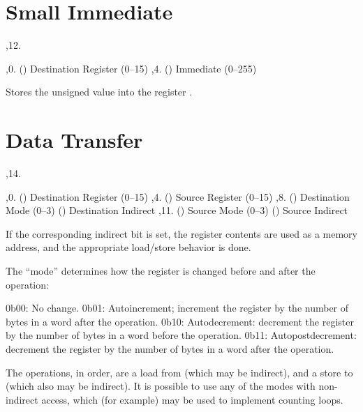 \section{Small Immediate}

\noindent\ins{},12. 

\li \ins{},0. () Destination Register (0--15)
\li \ins{},4. () Immediate (0--255)

Stores the unsigned value  into the register .

\section{Data Transfer}

\noindent\ins{},14. 

\li \ins{},0. () Destination Register (0--15)
\li \ins{},4. () Source Register (0--15)
\li \ins{},8. () Destination Mode (0--3)
\li \ins{} () Destination Indirect
\li \ins{},11. () Source Mode (0--3)
\li \ins{} () Source Indirect

If the corresponding indirect bit is set, the register contents are used as a
memory address, and the appropriate load/store behavior is done.

The ``mode'' determines how the register is changed before and after the
operation:

\li 0b00: No change.
\li 0b01: Autoincrement; increment the register by the number of bytes in a
word after the operation.
\li 0b10: Autodecrement: decrement the register by the number of bytes in a
word before the operation.
\li 0b11: Autopostdecrement: decrement the register by the number of bytes in a
word after the operation.

The operations, in order, are a load from  (which may be indirect), and
a store to  (which also may be indirect). It is possible to use any of
the modes with non-indirect access, which (for example) may be used to
implement counting loops.

\maybye
